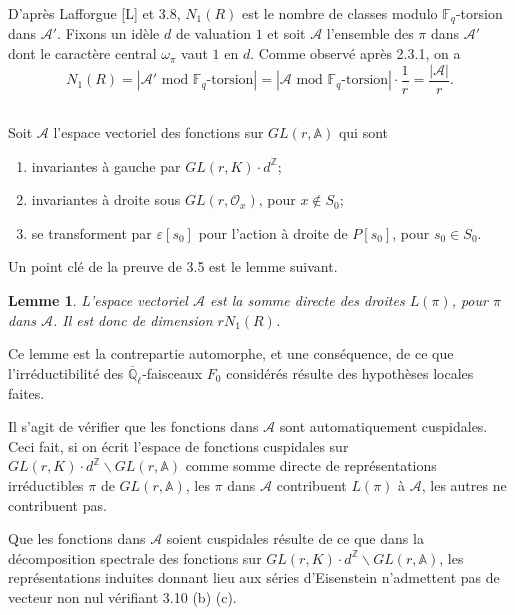 \documentclass[11pt,a4paper]{article}
\theoremstyle{plain}
\newtheorem{lemme}[theorem]{Lemme}
\theoremstyle{definition}
\newcommand{\Z}{\mathbb{Z}}
\newcommand{\F}{\mathbb{F}}
\newcommand{\Ql}{\overline{\mathbb{Q}}_\ell}
\begin{document}
D'apr\`es Lafforgue [L] et 3.8, $N_1(R)$ est le nombre de classes modulo $\F_q$-torsion dans $\mathcal{A}'$. Fixons un id\`ele $d$ de valuation $1$ et soit $\mathcal{A}$ l'ensemble des $\pi$ dans $\mathcal{A}'$ dont le caract\`ere central $\omega_\pi$ vaut $1$ en $d$. Comme observ\'e apr\`es 2.3.1, on a
\begin{equation}
N_1(R) = |\mathcal{A}' \text{ mod } \F_q\text{-torsion}| = |\mathcal{A} \text{ mod } \F_q\text{-torsion}| \cdot \frac{1}{r} = \frac{|\mathcal{A}|}{r}.
\tag{3.9.1}
\end{equation}

\subsection{}
Soit $\mathcal{A}$ l'espace vectoriel des fonctions sur $GL(r, \mathbb{A})$ qui sont
\begin{enumerate}[label=(\alph*)]
\item invariantes \`a gauche par $GL(r, K) \cdot d^\Z$;
\item invariantes \`a droite sous $GL(r, \mathcal{O}_x)$, pour $x \notin S_0$;
\item se transforment par $\varepsilon[s_0]$ pour l'action \`a droite de $P[s_0]$, pour $s_0 \in S_0$.
\end{enumerate}

Un point cl\'e de la preuve de 3.5 est le lemme suivant.

\begin{lemme}
L'espace vectoriel $\mathcal{A}$ est la somme directe des droites $L(\pi)$, pour $\pi$ dans $\mathcal{A}$. Il est donc de dimension $r N_1(R)$.
\end{lemme}

Ce lemme est la contrepartie automorphe, et une cons\'equence, de ce que l'irr\'eductibilit\'e des $\Ql$-faisceaux $F_0$ consid\'er\'es r\'esulte des hypoth\`eses locales faites.

Il s'agit de v\'erifier que les fonctions dans $\mathcal{A}$ sont automatiquement cuspidales. Ceci fait, si on \'ecrit l'espace de fonctions cuspidales sur $GL(r, K) \cdot d^\Z \backslash GL(r, \mathbb{A})$ comme somme directe de repr\'esentations irr\'eductibles $\pi$ de $GL(r, \mathbb{A})$, les $\pi$ dans $\mathcal{A}$ contribuent $L(\pi)$ \`a $\mathcal{A}$, les autres ne contribuent pas.

Que les fonctions dans $\mathcal{A}$ soient cuspidales r\'esulte de ce que dans la d\'ecomposition spectrale des fonctions sur $GL(r, K) \cdot d^\Z \backslash GL(r, \mathbb{A})$, les repr\'esentations induites donnant lieu aux s\'eries d'Eisenstein n'admettent pas de vecteur non nul v\'erifiant 3.10 (b) (c).
\end{document}
